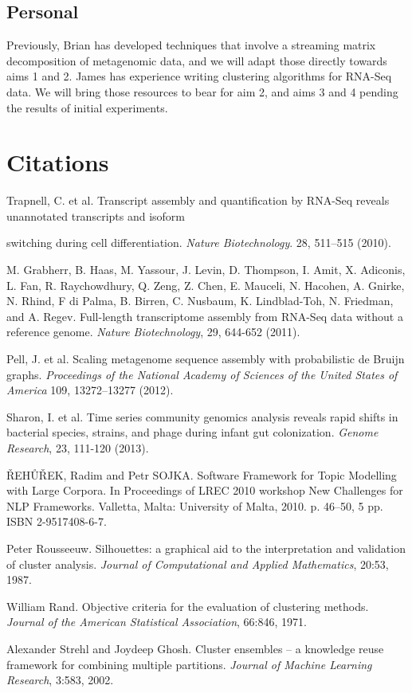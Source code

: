 \documentclass[11pt]{article}
\begin{document}
\subsection{Personal}
Previously, Brian has developed techniques that involve a streaming matrix decomposition of metagenomic data, and we will adapt those directly towards aims 1 and 2. James has experience writing clustering algorithms for RNA-Seq data. We will bring those resources to bear for aim 2, and aims 3 and 4 pending the results of initial experiments.

\section{Citations}
\begin{thebibliography}{9}

  Trapnell, C. et al. Transcript assembly and quantification by RNA-Seq reveals unannotated transcripts and isoform

switching during cell differentiation. {\sl Nature Biotechnology}. 28, 511–515 (2010).

  M. Grabherr, B. Haas, M. Yassour, J. Levin, D. Thompson, I. Amit, X. Adiconis, L. Fan, R. Raychowdhury, Q. Zeng, Z. Chen, E. Mauceli, N. Hacohen, A. Gnirke, N. Rhind, F di Palma, B. Birren, C. Nusbaum, K. Lindblad-Toh, N. Friedman, and A. Regev. Full-length transcriptome assembly from RNA-Seq data without a reference genome. \textit{Nature Biotechnology}, 29, 644-652 (2011).

  Pell, J. et al. Scaling metagenome sequence assembly with probabilistic de Bruijn graphs. {\sl Proceedings of the National Academy of Sciences of the United States of America} 109, 13272–13277 (2012).

  Sharon, I. et al. Time series community genomics analysis reveals rapid shifts in bacterial species, strains, and phage during infant gut colonization. {\sl Genome Research}, 23, 111-120 (2013).

  ŘEHŮŘEK, Radim and Petr SOJKA. Software Framework for Topic Modelling with Large Corpora. In Proceedings of LREC 2010 workshop New Challenges for NLP Frameworks. Valletta, Malta: University of Malta, 2010. p. 46--50, 5 pp. ISBN 2-9517408-6-7.

  Peter Rousseeuw. Silhouettes: a graphical aid to the interpretation and validation of cluster analysis. \emph{Journal of Computational and Applied Mathematics}, 20:53, 1987.

  William Rand. Objective criteria for the evaluation of clustering methods. \emph{Journal of the American Statistical Association}, 66:846, 1971.

  Alexander Strehl and Joydeep Ghosh. Cluster ensembles -- a knowledge reuse framework for combining multiple partitions. \emph{Journal of Machine Learning Research}, 3:583, 2002.

  \end{thebibliography}


\end{document}
